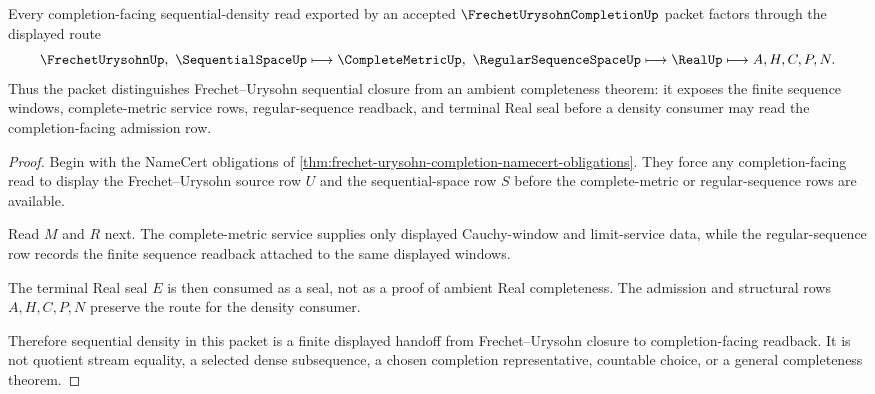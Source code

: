 \begin{theorem}
\label{thm:frechet-urysohn-completion-sequential-density}
Every completion-facing sequential-density read exported by an accepted $\FrechetUrysohnCompletionUp$ packet factors through the displayed route
$$
\FrechetUrysohnUp,\ \SequentialSpaceUp
\longmapsto
\CompleteMetricUp,\ \RegularSequenceSpaceUp
\longmapsto
\RealUp
\longmapsto
A,H,C,P,N .
$$
Thus the packet distinguishes Frechet--Urysohn sequential closure from an ambient completeness theorem: it exposes the finite sequence windows, complete-metric service rows, regular-sequence readback, and terminal Real seal before a density consumer may read the completion-facing admission row.
\end{theorem}
\begin{proof}
Begin with the NameCert obligations of \autoref{thm:frechet-urysohn-completion-namecert-obligations}. They force any completion-facing read to display the Frechet--Urysohn source row $U$ and the sequential-space row $S$ before the complete-metric or regular-sequence rows are available.

Read $M$ and $R$ next. The complete-metric service supplies only displayed Cauchy-window and limit-service data, while the regular-sequence row records the finite sequence readback attached to the same displayed windows.

The terminal Real seal $E$ is then consumed as a seal, not as a proof of ambient Real completeness. The admission and structural rows $A,H,C,P,N$ preserve the route for the density consumer.

Therefore sequential density in this packet is a finite displayed handoff from Frechet--Urysohn closure to completion-facing readback. It is not quotient stream equality, a selected dense subsequence, a chosen completion representative, countable choice, or a general completeness theorem.
\end{proof}



